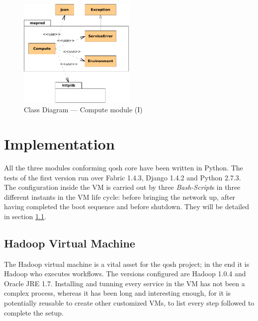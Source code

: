 \begin{figure}[tbp]
\begin{center}
\includegraphics[width=0.5\textwidth]{imagenes/027.pdf}
 \caption{Class Diagram --- Compute module (I)}
\label{fig:diagramaclasescompute1}
\end{center}
\end{figure}

\section{Implementation}\label{sec:implementacion}
\noindent All the three modules conforming qosh core have been written in Python. The tests of the first version run over Fabric 1.4.3, Django 1.4.2 and Python 2.7.3. The configuration inside the VM is carried out by three \emph{Bash-Script}s in three different instants in the VM life cycle: before bringing the network up, after having completed the boot sequence and before shutdown. They will be detailed in section \ref{subsec:maquinavirtual}.

\subsection{Hadoop Virtual Machine}\label{subsec:maquinavirtual}
\noindent The Hadoop virtual machine is a vital asset for the qosh project; in the end it is Hadoop who executes workflows. The versions configured are Hadoop 1.0.4 and Oracle JRE 1.7. Installing and tunning every service in the VM has not been a complex process, whereas it has been long and interesting enough, for it is potentially reusable to create other customized VMs, to list every step followed to complete the setup.

